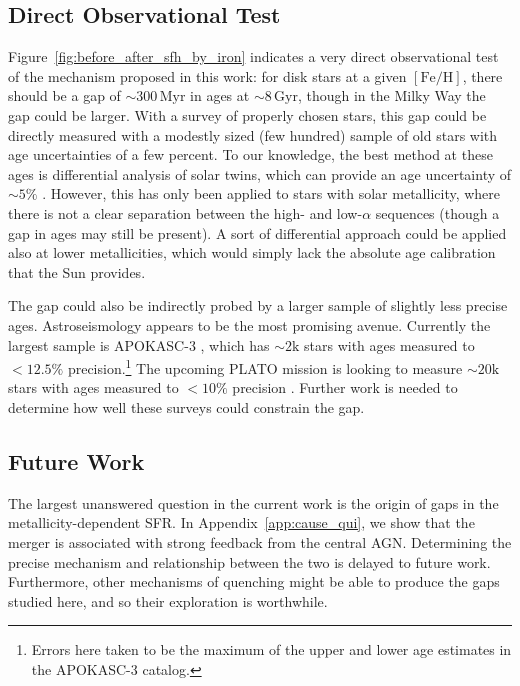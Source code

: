 \documentclass[twocolumn,linenumbers,trackchanges]{aastex631}
\newcommand{\Gyr}{\ensuremath{\textrm{Gyr}}}
\newcommand{\Myr}{\ensuremath{\textrm{Myr}}}
\newcommand{\FeH}{\ensuremath{[\textrm{Fe}/\textrm{H}]}}
\begin{document}
\subsection{Direct Observational Test}\label{ssec:obsqui}
Figure~\ref{fig:before_after_sfh_by_iron} indicates a very direct observational test of the mechanism proposed in this work: for disk stars at a given \FeH{}, there should be a gap of $\sim300\,\Myr$ in ages at $\sim8\,\Gyr$, though in the Milky Way the gap could be larger. With a survey of properly chosen stars, this gap could be directly measured with a modestly sized (few hundred) sample of old stars with age uncertainties of a few percent. To our knowledge, the best method at these ages is differential analysis of solar twins, which can provide an age uncertainty of $\sim5\%$ \citep[e.g.][]{2014ApJ...795...23B,2018MNRAS.474.2580S}. However, this has only been applied to stars with solar metallicity, where there is not a clear separation between the high- and low-$\alpha$ sequences (though a gap in ages may still be present). A sort of differential approach could be applied also at lower metallicities, which would simply lack the absolute age calibration that the Sun provides.

The gap could also be indirectly probed by a larger sample of slightly less precise ages. Astroseismology appears to be the most promising avenue. Currently the largest sample is APOKASC-3 \citep{2025ApJS..276...69P}, which has $\sim2\textrm{k}$ stars with ages measured to $<12.5\%$ precision.\footnote{Errors here taken to be the maximum of the upper and lower age estimates in the APOKASC-3 catalog.} The upcoming PLATO mission is looking to measure $\sim20\textrm{k}$ stars with ages measured to $<10\%$ precision \citep{2024arXiv240605447R}. Further work is needed to determine how well these surveys could constrain the gap.

\subsection{Future Work}\label{ssec:future_work}
The largest unanswered question in the current work is the origin of gaps in the metallicity-dependent SFR. In Appendix~\ref{app:cause_qui}, we show that the merger is associated with strong feedback from the central AGN. Determining the precise mechanism and relationship between the two is delayed to future work. Furthermore, other mechanisms of quenching might be able to produce the gaps studied here, and so their exploration is worthwhile.
\end{document}
